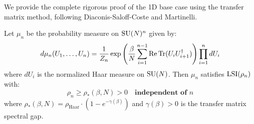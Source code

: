 We provide the complete rigorous proof of the 1D base case using the transfer 
matrix method, following Diaconis-Saloff-Coste and Martinelli.

\begin{theorem}
\label{thm:1d-uniform-complete}
Let $\mu_n$ be the probability measure on $\mathrm{SU}(N)^n$ given by:
\[
d\mu_n(U_1, \ldots, U_n) = \frac{1}{Z_n} \exp\left(\frac{\beta}{N}\sum_{i=1}^{n-1} \operatorname{Re}\operatorname{Tr}(U_i U_{i+1}^\dagger)\right) \prod_{i=1}^n dU_i
\]
where $dU_i$ is the normalized Haar measure on $\mathrm{SU}(N)$. Then $\mu_n$ satisfies 
$\operatorname{LSI}(\rho_n)$ with:
\[
\rho_n \geq \rho_*(\beta, N) > 0 \quad \textbf{independent of } n
\]
where $\rho_*(\beta, N) = \rho_{\mathrm{Haar}} \cdot (1 - e^{-\gamma(\beta)})$ and $\gamma(\beta) > 0$ 
is the transfer matrix spectral gap.
\end{theorem}

